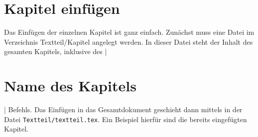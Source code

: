 
\chapter{Kapitel einfügen}

Das Einfügen der einzelnen Kapitel ist ganz einfach. 
Zunächst muss eine Datei im Verzeichnis Textteil/Kapitel angelegt werden. 
In dieser Datei steht der Inhalt des gesamten Kapitels, inklusive des \befehl|\chapter{Name des Kapitels}| Befehls. 
Das Einfügen in das Gesamtdokument geschieht dann mittels \befehl{} in der Datei \texttt{Textteil/textteil.tex}.
Ein Beispiel hierfür sind die bereits eingefügten Kapitel.